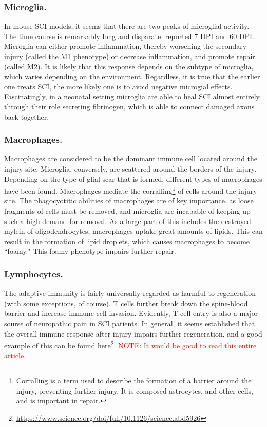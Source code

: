 \subsubsection{Microglia.}
In mouse SCI models, it seems that there are two peaks of microglial activity. The time course is remarkably long and disparate, reported 7 DPI and 60 DPI. Microglia can either promote inflammation, thereby worsening the secondary injury (called the M1 phenotype) or decrease inflammation, and promote repair (called M2). It is likely that this response depends on the subtype of microglia, which varies depending on the environment. Regardless, it is true that the earlier one treats SCI, the more likely one is to avoid negative microgial effects. Fascinatingly, in a neonatal setting microglia are able to heal SCI almost entirely through their role secreting fibrinogen, which is able to connect damaged axons back together. 

\subsubsection{Macrophages.}
Macrophages are considered to be the dominant immune cell located around the injury site. Microglia, conversely, are scattered around the borders of the injury. Depending on the type of glial scar that is formed, different types of macrophages have been found. Macrophages mediate the corralling\footnote{Corralling is a term used to describe the formation of a barrier around the injury, preventing further injury. It is composed astrocytes, and other cells, and is important in repair.} of cells around the injury site. The phagocyotitic abilities of macrophages are of key importance, as loose fragments of cells must be removed, and microglia are incapable of keeping up such a high demand for removal. As a large part of this includes the destroyed mylein of oligodendrocytes, macrophages uptake great amounts of lipids. This can result in the formation of lipid droplets, which causes macrophages to become ``foamy." This foamy phenotype impairs further repair. 

\subsubsection{Lymphocytes.} 
The adaptive immunity is fairly universally regarded as harmful to regeneration (with some exceptions, of course). T cells further break down the spine-blood barrier and increase immune cell invasion. Evidently, T cell entry is also a major sourse of neuropathic pain in SCI patients. In general, it seems established that the overall immune response after injury impairs further regeneration, and a good example of this can be found here\footnote{\url{https://www.science.org/doi/full/10.1126/science.abd5926}}. \textcolor{red}{NOTE: It would be good to read this entire article.}

